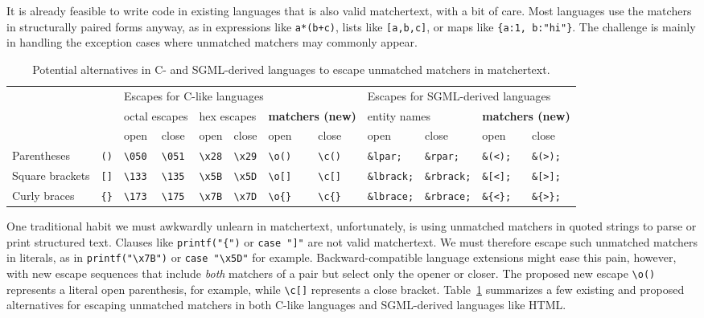 It is already feasible to write code in existing languages
that is also valid matchertext,
with a bit of care.
Most languages use the matchers in structurally paired forms anyway,
as in expressions like \verb|a*(b+c)|,
lists like \verb|[a,b,c]|,
or maps like \verb|{a:1, b:"hi"}|.
The challenge is mainly in handling the exception cases
where unmatched matchers may commonly appear.

\begin{table}[t]
\begin{center}
\begin{footnotesize}
\begin{tabular}{ll||ll|ll|ll||ll|ll}
&		& \multicolumn{6}{|l||}{Escapes for C-like languages}
		& \multicolumn{4}{|l}{Escapes for SGML-derived languages} \\
&		& \multicolumn{2}{|l|}{octal escapes}
		& \multicolumn{2}{|l|}{hex escapes}
		& \multicolumn{2}{|l||}{\bf matchers (new)}
		& \multicolumn{2}{|l|}{entity names}
		& \multicolumn{2}{|l}{\bf matchers (new)}		\\
		&
		& open			& close
		& open			& close
		& open			& close
		& open			& close
		& open			& close		\\
\hline
Parentheses	& \verb|()|
		& \verb|\050|		& \verb|\051|
		& \verb|\x28|		& \verb|\x29|
		& \verb|\o()|		& \verb|\c()|
		& \verb|&lpar;|		& \verb|&rpar;|
		& \verb|&(<);|		& \verb|&(>);|	\\
Square brackets	& \verb|[]|
		& \verb|\133|		& \verb|\135|
		& \verb|\x5B|		& \verb|\x5D|
		& \verb|\o[]|		& \verb|\c[]|
		& \verb|&lbrack;|	& \verb|&rbrack;|
		& \verb|&[<];|		& \verb|&[>];|	\\
		
Curly braces	& \verb|{}|
		& \verb|\173|		& \verb|\175|
		& \verb|\x7B|		& \verb|\x7D|
		& \verb|\o{}|		& \verb|\c{}|
		& \verb|&lbrace;|	& \verb|&rbrace;|
		& \verb|&{<};|		& \verb|&{>};|	\\

\end{tabular}
\end{footnotesize}
\end{center}
\caption{Potential alternatives in C- and SGML-derived languages
	to escape unmatched matchers in matchertext.}
\label{tab:unmatched-matchers}
\end{table}

One traditional habit we must awkwardly unlearn in matchertext,
unfortunately,
is using unmatched matchers in quoted strings
to parse or print structured text.
Clauses like \verb|printf("{")| or \verb|case "]"|
are not valid matchertext.
We must therefore escape such unmatched matchers in literals,
as in \verb|printf("\x7B")| or \verb|case "\x5D"| for example.
Backward-compatible language extensions might ease this pain,
however, 
with new escape sequences that include \emph{both} matchers of a pair
but select only the opener or closer.
The proposed new escape \verb|\o()| represents a literal open parenthesis,
for example,
while \verb|\c[]| represents a close bracket.
Table~\ref{tab:unmatched-matchers} summarizes a few existing and proposed
alternatives for escaping unmatched matchers
in both C-like languages and SGML-derived languages like HTML.

